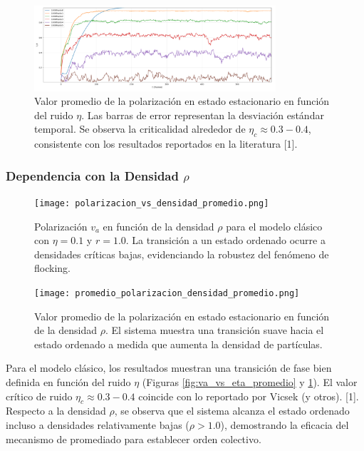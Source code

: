 \documentclass{article}
\begin{document}
\begin{figure}[H]
\centering
\includegraphics[width=0.8\textwidth]{promedio_polarizacion_ruido_promedio.png}
\caption{Valor promedio de la polarización en estado estacionario en función del ruido $\eta$. Las barras de error representan la desviación estándar temporal. Se observa la criticalidad alrededor de $\eta_c \approx 0.3-0.4$, consistente con los resultados reportados en la literatura [1].}
\label{fig:promedio_va_eta_promedio}
\end{figure}

\subsubsection{Dependencia con la Densidad $\rho$}
\begin{figure}[H]
\centering
\texttt{[image: polarizacion\_vs\_densidad\_promedio.png]}
\caption{Polarización $v_a$ en función de la densidad $\rho$ para el modelo clásico con $\eta = 0.1$ y $r = 1.0$. La transición a un estado ordenado ocurre a densidades críticas bajas, evidenciando la robustez del fenómeno de flocking.}
\label{fig:va_vs_rho_promedio}
\end{figure}

\begin{figure}[H]
\centering
\texttt{[image: promedio\_polarizacion\_densidad\_promedio.png]}
\caption{Valor promedio de la polarización en estado estacionario en función de la densidad $\rho$. El sistema muestra una transición suave hacia el estado ordenado a medida que aumenta la densidad de partículas.}
\label{fig:promedio_va_rho_promedio}
\end{figure}

Para el modelo clásico, los resultados muestran una transición de fase bien definida en función del ruido $\eta$ (Figuras \ref{fig:va_vs_eta_promedio} y \ref{fig:promedio_va_eta_promedio}). El valor crítico de ruido $\eta_c \approx 0.3-0.4$ coincide con lo reportado por Vicsek (y otros). [1]. Respecto a la densidad $\rho$, se observa que el sistema alcanza el estado ordenado incluso a densidades relativamente bajas ($\rho > 1.0$), demostrando la eficacia del mecanismo de promediado para establecer orden colectivo.
\end{document}
